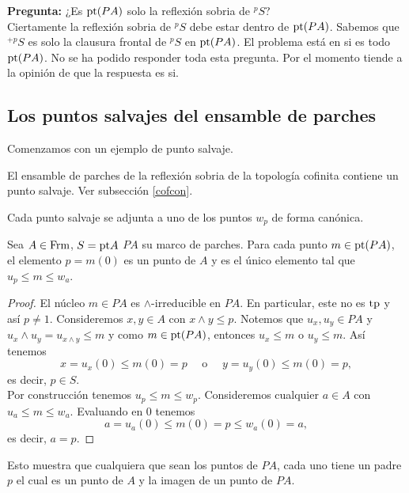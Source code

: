 \textbf{Pregunta:} ¿Es $\mathrm{pt}(PA)$ solo la reflexión sobria de $^pS$?\\

Ciertamente la reflexión sobria de $^pS$ debe estar dentro de $\mathrm{pt}(PA)$. Sabemos que $^{+p}S$ es solo la clausura frontal de $^pS$ en $\mathrm{pt}(PA)$. El problema está en si es todo $\mathrm{pt}(PA)$. No se ha podido responder toda esta pregunta. Por el momento tiende a la opinión de que la respuesta es si.

\subsection{Los puntos salvajes del ensamble de parches}

Comenzamos con un ejemplo de punto salvaje.

\begin{ej}\label{Ejemplo9.4.1}
    El ensamble de parches de la reflexión sobria de la topología cofinita contiene un punto salvaje. Ver subsección \ref{cofcon}.
\end{ej}

Cada punto salvaje se adjunta a uno de los puntos $w_p$ de forma canónica.

\begin{lem}\label{Lema9.4.2}
    Sea $A\in \mathrm{Frm}$, $S=\mathrm{pt} A$ $PA$ su marco de parches. Para cada punto $m\in \mathrm{pt}(PA)$, el elemento $p=m(0)$ es un punto de $A$ y es el único elemento tal que $u_p\leq m\leq w_a$.
\end{lem}

\begin{proof}
    El núcleo $m\in PA$ es $\wedge$-irreducible en $PA$. En particular, este no es $\mathrm{tp}$ y así $p\neq 1$. Consideremos $x, y\in A$ con $x\wedge y\leq p$. Notemos que $u_x, u_y\in PA$ y $u_x\wedge u_y=u_{x\wedge y}\leq m$ y como $m\in \mathrm{pt}(PA)$, entonces $u_x\leq m$ o $u_y\leq m$. Así tenemos 
    \[
    x=u_x(0)\leq m(0)=p\quad\mbox{ o }\quad y=u_y(0)\leq m(0)=p,
    \]
    es decir, $p\in S$.\\

    Por construcción tenemos $u_p\leq m\leq w_p$. Consideremos cualquier $a\in A$ con $u_a\leq m\leq w_a$. Evaluando en $0$ tenemos
    \[
    a=u_a(0)\leq m(0)=p\leq w_a(0)=a,
    \]
    es decir, $a=p$.
\end{proof}

Esto muestra que cualquiera que sean los puntos de $PA$, cada uno tiene un padre $p$ el cual es un punto de $A$ y la imagen de un punto de $PA$.\\

